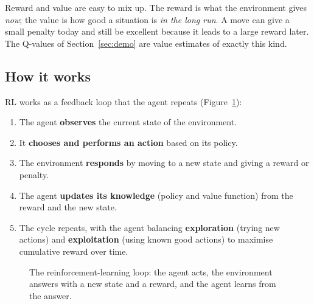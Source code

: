\documentclass[11pt, a4paper]{article}
\begin{document}
Reward and value are easy to mix up. The reward is what the environment gives \emph{now}; the value is how good a situation is \emph{in the long run}. A move can give a small penalty today and still be excellent because it leads to a large reward later. The Q-values of Section~\ref{sec:demo} are value estimates of exactly this kind.

\subsection{How it works}

RL works as a feedback loop that the agent repeats (Figure~\ref{fig:loop}):

\begin{enumerate}
    \item The agent \textbf{observes} the current state of the environment.
    \item It \textbf{chooses and performs an action} based on its policy.
    \item The environment \textbf{responds} by moving to a new state and giving a reward or penalty.
    \item The agent \textbf{updates its knowledge} (policy and value function) from the reward and the new state.
    \item The cycle repeats, with the agent balancing \textbf{exploration} (trying new actions) and \textbf{exploitation} (using known good actions) to maximise cumulative reward over time.
\end{enumerate}

\begin{figure}[H]
\centering
{}
\caption{The reinforcement-learning loop: the agent acts, the environment answers with a new state and a reward, and the agent learns from the answer.}
\label{fig:loop}
\end{figure}
\end{document}
